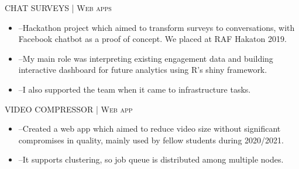 %
\begin{minipage}[t]{\linewidth}\vspace{\subsectionSpace}
{\subtitleFont\bold CHAT SURVEYS \extraLight\scshape| Web apps \href{https://github.com/Runtime-T-error}{\faGithub}}\newline

\vspace{\ribbonTopMargin}
\ribbonR \ribbonTidyverse \ribbonPostgres \ribbonJava \ribbonSpringBoot\newline
\vspace{\ribbonBottomMargin}

{\contentFont \begin{itemize}
    \item --Hackathon project which aimed to transform surveys to conversations, with Facebook chatbot as a proof of concept. We placed  at RAF Hakaton 2019.
    \item --My main role was interpreting existing engagement data and building interactive dashboard for future analytics using R's shiny framework.
    \item --I also supported the team when it came to infrastructure tasks.
\end{itemize}}
\end{minipage}\newline%
%
\begin{minipage}[t]{\linewidth}\vspace{\subsectionSpace}
{\subtitleFont\bold VIDEO COMPRESSOR \extraLight\scshape| Web app \href{https://github.com/luka-j/MediaCompressor}{\faGithub}}\newline

\vspace{\ribbonTopMargin}
\ribbonKotlin \ribbonSpringBoot \ribbonPostgres \ribbonFfmpeg\newline
\vspace{\ribbonBottomMargin}

{\contentFont\begin{itemize}
    \item --Created a web app which aimed to reduce video size without significant compromises in quality, mainly used by fellow students during 2020/2021.
    \item --It supports clustering, so job queue is distributed among multiple nodes.
\end{itemize}}
\end{minipage}\newline%
%
